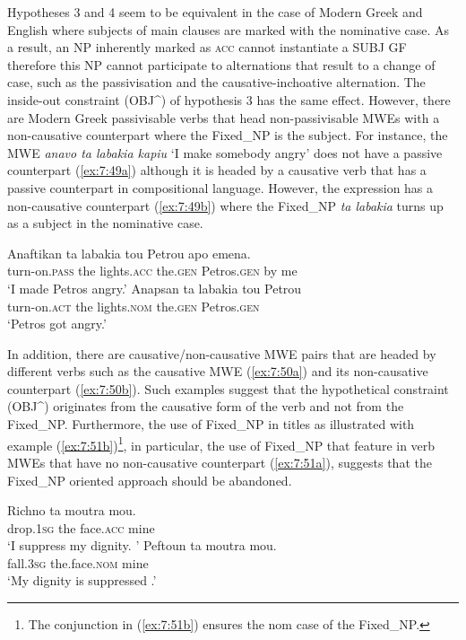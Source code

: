 \documentclass[output=paper]{langsci/langscibook}
\begin{document}
Hypotheses 3 and 4 seem to be equivalent in the case of Modern Greek and English where subjects of main clauses are marked with the nominative case. As a result, an NP inherently marked as \textsc{acc}  cannot instantiate a SUBJ GF therefore this NP cannot participate to alternations that result to a change of case, such as the passivisation and the causative-inchoative alternation. The inside-out constraint (OBJ\^{}) of hypothesis 3 has the same effect. However, there are Modern Greek passivisable verbs that head non-passivisable MWEs with a non-causative counterpart where the Fixed\_NP  is the subject. For instance, the MWE  {\normalfont \itshape anavo ta labakia kapiu} `I make somebody angry' does not have a passive counterpart (\ref{ex:7:49a}) although it is headed by a causative verb that has a passive counterpart in compositional language. However, the expression has a non-causative counterpart (\ref{ex:7:49b}) where the Fixed\_NP \textit{ta labakia} turns up as a subject in the nominative case. 

\ea%
\label{ex:7:49}
\ea \label{ex:7:49a}
\gll  *Anaftikan ta labakia tou Petrou apo emena.  \\
       turn-on.\textsc{pass} the lights.\textsc{acc} the.\textsc{gen} Petros.\textsc{gen} by me \\
\glt `I made Petros angry.'
\ex \label{ex:7:49b}
\gll Anapsan ta labakia tou Petrou \\
     turn-on.\textsc{act} the lights.\textsc{nom} the.\textsc{gen} Petros.\textsc{gen} \\
\glt    `Petros got angry.'
\z
\z

In addition, there are causative/non-causative MWE pairs that are headed by different verbs such as the causative MWE (\ref{ex:7:50a}) and its non-causative counterpart (\ref{ex:7:50b}). Such examples suggest that the hypothetical constraint (OBJ\^{})  originates from  the causative form of the verb and not from the Fixed\_NP. Furthermore, the use of Fixed\_NP in titles as illustrated with example (\ref{ex:7:51b})\footnote{The conjunction in (\ref{ex:7:51b}) ensures the nom case of  the Fixed\_NP.}, in particular, the use of Fixed\_NP that feature in verb MWEs that have no non-causative counterpart (\ref{ex:7:51a}), suggests that the Fixed\_NP oriented approach should be abandoned.   


\ea%
\label{ex:7:50}
\ea \label{ex:7:50a}
\gll Richno ta moutra mou.\\
        drop.\textsc{1sg} the face.\textsc{acc} mine\\
\glt `I suppress my dignity. '
\ex \label{ex:7:50b}
\gll Peftoun ta moutra mou.\\
         fall.\textsc{3sg} the.face.\textsc{nom} mine\\
\glt   `My dignity is suppressed .'
\z
\z
\end{document}
